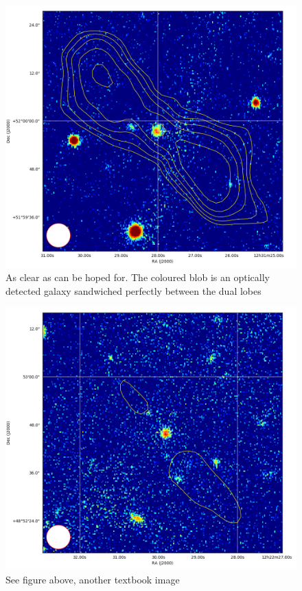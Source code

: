 \documentclass{article}
\begin{document}
\begin{figure}
    \centering
    \includegraphics[scale = 0.5]{nice1.png}
    \caption{As clear as can be hoped for. The coloured blob is an optically detected galaxy sandwiched perfectly between the dual lobes}
\end{figure}

\begin{figure}
    \centering
    \includegraphics[scale = 0.5]{nice2.png}
    \caption{See figure above, another textbook image}
\end{figure}
\end{document}
